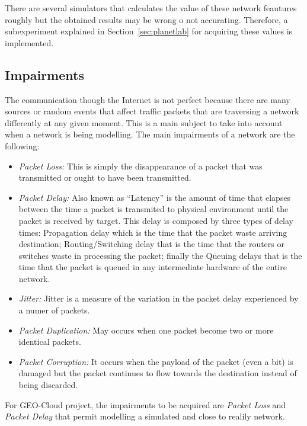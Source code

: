 There are several simulators that
calculates the value of these network feautures roughly but the obtained results
may be wrong o not accurating. Therefore, a subexperiment explained in
Section~\ref{sec:planetlab} for acquiring these values is implemented. 

\subsection{Impairments}

The communication though the Internet is not perfect because there are many
sources or random events that affect traffic packets that are traversing a
network differently at any given moment. This is a main
subject to take into account when a network is being modelling. The main
impairments
 of a network are the following:

\begin{itemize}
\item \emph{Packet Loss:} This is simply the disappearance of a packet that was
  transmitted or ought to have been transmitted.
\item \emph{Packet Delay:} Also known as ``Latency'' is the amount of time that elapses between the time a
  packet is transmited to physical environment until the packet is received by
  target. This delay is composed by three types of delay times: Propagation
  delay which is the time that the packet waste arriving destination;
  Routing/Switching delay that is the time that the routers or
  switches waste in processing the packet; finally the Queuing delays that is
  the time that the packet is queued in any intermediate hardware of the entire network.
\item \emph{Jitter:} Jitter is a measure of the variation in the packet delay
  experienced by a numer of packets. 
\item \emph{Packet Duplication:} May occurs when one packet become two or more
  identical packets.
\item \emph{Packet Corruption:} It occurs when the payload of the packet (even a bit)
  is damaged but the packet continues to flow towards the destination instead of
  being discarded.
\end{itemize}

For GEO-Cloud project, the impairments to be acquired are \emph{Packet Loss} and
\emph{Packet Delay} that permit modelling a simulated and close to realily network.


